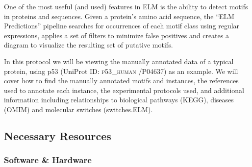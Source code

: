 \documentclass[12pt]{article}
\newcounter{proto}
\newcommand\uniprot[1]{%
	\textsc{\lowercase{#1}}%
}
\begin{document}
One of the most useful (and used) features in ELM is the ability to
detect motifs in proteins and sequences. Given a protein's amino acid
sequence, the ``ELM Predictions'' pipeline searches for occurrences of
each motif class using regular expressions, applies a set of filters to
minimize false positives and creates a diagram to visualize the resulting
set of putative motifs.

In this protocol we will be viewing the manually annotated data of a
typical protein, using p53 (UniProt ID: \uniprot{P53\_HUMAN}/P04637) as an
example. We will cover how to find the manually annotated motifs and instances,
the references used to annotate each
instance, the experimental protocols used, and additional information including
relationships to biological pathways (KEGG), diseases (OMIM) and molecular
switches (switches.ELM).

%
%
\subsection*{Necessary Resources}
\subsubsection*{Software \& Hardware}

\end{document}
